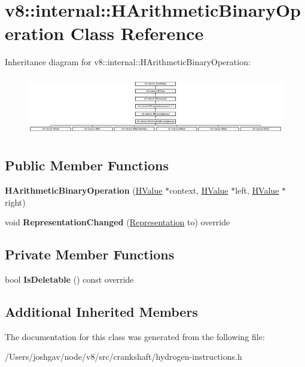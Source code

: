 \hypertarget{classv8_1_1internal_1_1_h_arithmetic_binary_operation}{}\section{v8\+:\+:internal\+:\+:H\+Arithmetic\+Binary\+Operation Class Reference}
\label{classv8_1_1internal_1_1_h_arithmetic_binary_operation}
Inheritance diagram for v8\+:\+:internal\+:\+:H\+Arithmetic\+Binary\+Operation\+:\begin{figure}[H]
\begin{center}
\leavevmode
\includegraphics[height=2.655826cm]{classv8_1_1internal_1_1_h_arithmetic_binary_operation}
\end{center}
\end{figure}
\subsection*{Public Member Functions}
\begin{DoxyCompactItemize}
\item 
{\bfseries H\+Arithmetic\+Binary\+Operation} (\hyperlink{classv8_1_1internal_1_1_h_value}{H\+Value} $\ast$context, \hyperlink{classv8_1_1internal_1_1_h_value}{H\+Value} $\ast$left, \hyperlink{classv8_1_1internal_1_1_h_value}{H\+Value} $\ast$right)\hypertarget{classv8_1_1internal_1_1_h_arithmetic_binary_operation_aa3b1ff5f8f327f2ad8c5ad744b30978a}{}\label{classv8_1_1internal_1_1_h_arithmetic_binary_operation_aa3b1ff5f8f327f2ad8c5ad744b30978a}

\item 
void {\bfseries Representation\+Changed} (\hyperlink{classv8_1_1internal_1_1_representation}{Representation} to) override\hypertarget{classv8_1_1internal_1_1_h_arithmetic_binary_operation_ab8d33cd9c22148aa3ba2155615bb4ec5}{}\label{classv8_1_1internal_1_1_h_arithmetic_binary_operation_ab8d33cd9c22148aa3ba2155615bb4ec5}

\end{DoxyCompactItemize}
\subsection*{Private Member Functions}
\begin{DoxyCompactItemize}
\item 
bool {\bfseries Is\+Deletable} () const  override\hypertarget{classv8_1_1internal_1_1_h_arithmetic_binary_operation_a2b9443d74d53a1c9a975ad01708fc660}{}\label{classv8_1_1internal_1_1_h_arithmetic_binary_operation_a2b9443d74d53a1c9a975ad01708fc660}

\end{DoxyCompactItemize}
\subsection*{Additional Inherited Members}


The documentation for this class was generated from the following file\+:\begin{DoxyCompactItemize}
\item 
/\+Users/joshgav/node/v8/src/crankshaft/hydrogen-\/instructions.\+h\end{DoxyCompactItemize}
